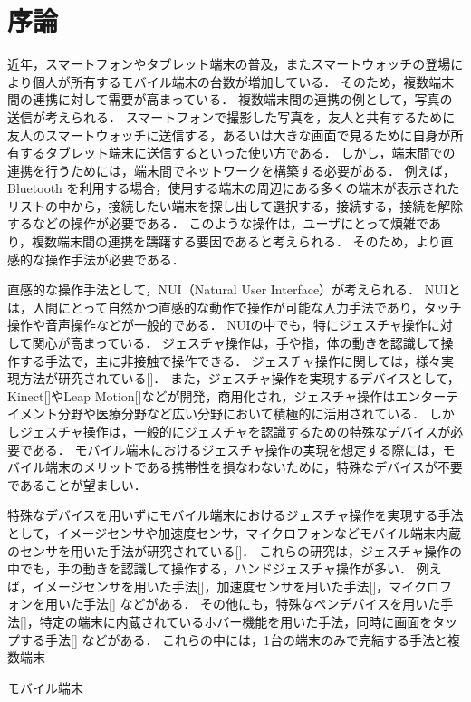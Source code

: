 
\chapter{序論}
近年，スマートフォンやタブレット端末の普及，またスマートウォッチの登場により個人が所有するモバイル端末の台数が増加している．
そのため，複数端末間の連携に対して需要が高まっている．
複数端末間の連携の例として，写真の送信が考えられる．
スマートフォンで撮影した写真を，友人と共有するために友人のスマートウォッチに送信する，あるいは大きな画面で見るために自身が所有するタブレット端末に送信するといった使い方である．
しかし，端末間での連携を行うためには，端末間でネットワークを構築する必要がある．
例えば，Bluetooth を利用する場合，使用する端末の周辺にある多くの端末が表示されたリストの中から，接続したい端末を探し出して選択する，接続する，接続を解除するなどの操作が必要である．
このような操作は，ユーザにとって煩雑であり，複数端末間の連携を躊躇する要因であると考えられる．
そのため，より直感的な操作手法が必要である．

直感的な操作手法として，NUI（Natural User Interface）が考えられる．
NUIとは，人間にとって自然かつ直感的な動作で操作が可能な入力手法であり，タッチ操作や音声操作などが一般的である．
NUIの中でも，特にジェスチャ操作に対して関心が高まっている．
ジェスチャ操作は，手や指，体の動きを認識して操作する手法で，主に非接触で操作できる．
ジェスチャ操作に関しては，様々実現方法が研究されている[]．
また，ジェスチャ操作を実現するデバイスとして，Kinect[]やLeap Motion[]などが開発，商用化され，ジェスチャ操作はエンターテイメント分野や医療分野など広い分野において積極的に活用されている．
しかしジェスチャ操作は，一般的にジェスチャを認識するための特殊なデバイスが必要である．
モバイル端末におけるジェスチャ操作の実現を想定する際には，モバイル端末のメリットである携帯性を損なわないために，特殊なデバイスが不要であることが望ましい．

特殊なデバイスを用いずにモバイル端末におけるジェスチャ操作を実現する手法として，イメージセンサや加速度センサ，マイクロフォンなどモバイル端末内蔵のセンサを用いた手法が研究されている[]．
これらの研究は，ジェスチャ操作の中でも，手の動きを認識して操作する，ハンドジェスチャ操作が多い．
例えば，イメージセンサを用いた手法[]，加速度センサを用いた手法[]，マイクロフォンを用いた手法[] などがある．
その他にも，特殊なペンデバイスを用いた手法[]，特定の端末に内蔵されているホバー機能を用いた手法，同時に画面をタップする手法[] などがある．
これらの中には，1台の端末のみで完結する手法と複数端末

モバイル端末

